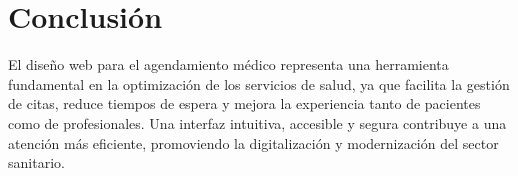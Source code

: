 \section*{Conclusión}

El diseño web para el agendamiento médico representa una herramienta fundamental en la optimización de los servicios de salud, ya que facilita la gestión de citas, reduce tiempos de espera y mejora la experiencia tanto de pacientes como de profesionales. Una interfaz intuitiva, accesible y segura contribuye a una atención más eficiente, promoviendo la digitalización y modernización del sector sanitario.
